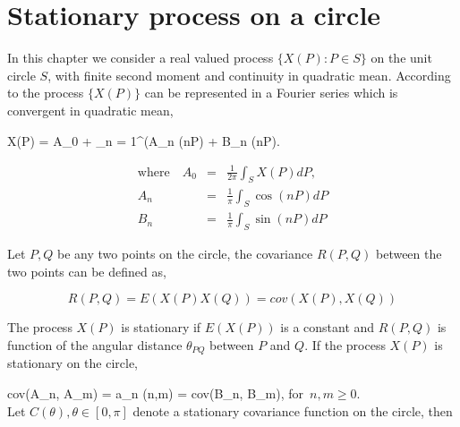 
\section{Stationary process on a circle}

In this chapter we consider a real valued process $\{X(P): P\in S\}$ on the unit circle $S$, with finite second moment and continuity in quadratic mean. According to \cite{DUFOUR1976107} the process $\{X(P)\}$ can be represented in a Fourier series which is convergent in quadratic mean,

\beq
X(P) = A_0 + \sum_{n = 1}^\infty (A_n \cos(nP) + B_n \sin(nP).
\eeq


\begin{eqnarray}
	\nonumber
	\mbox{where} \quad A_0 &=&  \frac{1}{2\pi} \int_S X(P)dP, \\ \nonumber
	A_n &=& \frac{1}{\pi} \int_S \cos(nP)dP \\ 
	B_n &=& \frac{1}{\pi} \int_S \sin(nP)dP 
\end{eqnarray}

Let $P,Q$ be any two points on the circle, the covariance $R(P,Q)$ between the two points can be defined as,

\[
	R(P,Q) = E(X(P)X(Q)) = cov(X(P), X(Q))
\]

The process $X(P)$ is stationary if $E(X(P))$ is a constant and $R(P,Q)$ is function of the angular distance $\theta_{PQ}$ between $P$ and $Q$. If the process $X(P)$ is stationary on the circle,

\beq
cov(A_n, A_m) = a_n \delta(n,m) = cov(B_n, B_m), \quad \mbox{for $n, m \ge 0$}.
\eeq\\


Let $C(\theta), \theta \in [0, \pi ]$ denote a stationary covariance function on the circle, then

